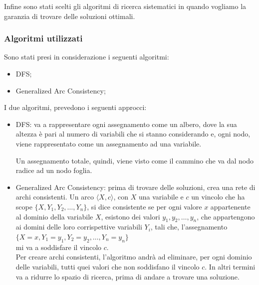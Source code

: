 \documentclass[12pt, letterpaper]{article}
\begin{document}
\noindent Infine sono stati scelti gli algoritmi di ricerca sistematici in quando vogliamo la garanzia di
trovare delle soluzioni ottimali.

\subsubsection{Algoritmi utilizzati}

Sono stati presi in considerazione i seguenti algoritmi:

\begin{itemize}
      \item DFS;
      \item Generalized Arc Consistency;
\end{itemize}

\noindent I due algoritmi, prevedono i seguenti approcci: \\

\begin{itemize}
      \item DFS: va a rappresentare ogni assegnamento come un albero, dove la sua altezza è
            pari al numero di variabili che si stanno considerando e, ogni nodo, viene
            rappresentato come un assegnamento ad una variabile.

            Un assegnamento totale, quindi, viene visto come il cammino che va dal nodo radice ad
            un nodo foglia.

      \item Generalized Arc Consistency: prima di trovare delle soluzioni, crea una rete di archi consistenti.
            Un arco $\langle X, c \rangle$, con $X$ una variabile e $c$ un vincolo che ha
            scope $\{X, Y_1, Y_2, \dots, Y_n\}$, si dice consistente se per ogni valore $x$ appartenente al dominio
            della variabile $X$, esistono dei valori $y_1, y_2, \dots, y_n$, che appartengono ai domini delle loro
            corrispettive variabili $Y_i$, tali che, l'assegnamento $\{X=x, Y_1=y_1, Y_2=y_2, \dots, Y_n=y_n\}$ \\
            mi va a soddisfare il vincolo $c$. \\

            Per creare archi consistenti, l'algoritmo andrà ad eliminare, per ogni dominio delle variabili, tutti
            quei valori che non soddisfano il vincolo $c$. In altri termini va a ridurre lo spazio di ricerca, prima di
            andare a trovare una soluzione. \\
\end{itemize}
\end{document}
